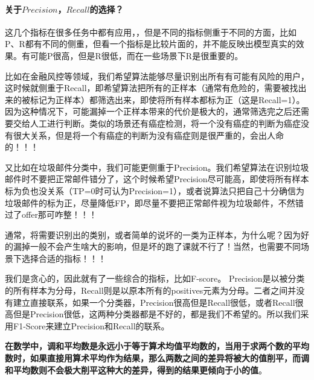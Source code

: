 \paragraph*{关于$Precision$，$Recall$的选择？}这几个指标在很多任务中都有应用，，但是不同的指标侧重于不同的方面，比如P、R都有不同的侧重，但看一个指标是比较片面的，并不能反映出模型真实的效果。有可能P很高，但是R很低，而在一些场景下R是很重要的。

比如在金融风控等领域，我们希望算法能够尽量识别出所有有可能有风险的用户，这时候就侧重于Recall，即希望算法把所有的正样本（通常有危险的，需要被找出来的被标记为正样本）都筛选出来，即使将所有样本都标为正（这是Recall=1）。因为这种情况下，可能漏掉一个正样本带来的代价是极大的，通常筛选完之后还需要交给人工进行判断。类似的场景还有癌症检测，将一个没有癌症的判断为癌症没有很大关系，但是将一个有癌症的判断为没有癌症则是很严重的，会出人命的！！！

又比如在垃圾邮件分类中，我们可能更侧重于Precision。我们希望算法在识别垃圾邮件时不要把正常邮件错分了，这个时候希望Precision尽可能高，即使将所有样本标为负也没关系（TP=0时可认为Precision=1），或者说算法只把自己十分确信为垃圾邮件的标为正，尽量降低FP，即尽量不要把正常邮件视为垃圾邮件，不然错过了offer那可咋整！！！

通常，将需要识别出的类别，或者简单的说坏的一类为正样本，为什么呢？因为好的漏掉一般不会产生啥大的影响，但是坏的跑了课就不行了！当然，也需要不同场景下选择合适的指标！！！

我们是贪心的，因此就有了一些综合的指标，比如F-score。
Precision是以被分类的所有样本为分母，Recall则是以原本所有的positives元素为分母。二者之间并没有建立直接联系，如果一个分类器，Precision很高但是Recall很低，或者Recall很高但是Precision很低，这两种分类器都是不好的，都是我们不希望的。所以我们采用F1-Score来建立Precision和Recall的联系。

\textbf{在数学中，调和平均数是永远小于等于算术均值平均数的，当用于求两个数的平均数时，如果直接用算术平均作为结果，那么两数之间的差异将被大的值削平，而调和平均数则不会极大削平这种大的差异，得到的结果更倾向于小的值}。

